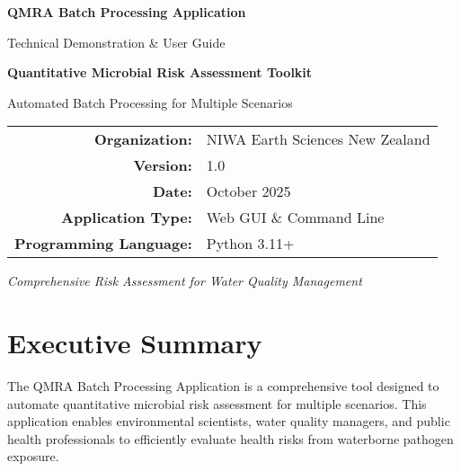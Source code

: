 \documentclass[11pt,a4paper]{article}
\begin{document}
\begin{titlepage}
    \centering
    \vspace*{2cm}

    {\Huge\bfseries\color{niwablue} QMRA Batch Processing Application\par}
    \vspace{0.5cm}
    {\LARGE Technical Demonstration \& User Guide\par}
    \vspace{2cm}

    {\Large\bfseries Quantitative Microbial Risk Assessment Toolkit\par}
    \vspace{0.5cm}
    {\large Automated Batch Processing for Multiple Scenarios\par}

    \vspace{3cm}

    \begin{tabular}{rl}
        \textbf{Organization:} & NIWA Earth Sciences New Zealand \\
        \textbf{Version:} & 1.0 \\
        \textbf{Date:} & October 2025 \\
        \textbf{Application Type:} & Web GUI \& Command Line \\
        \textbf{Programming Language:} & Python 3.11+ \\
    \end{tabular}

    \vfill

    {\large\textit{Comprehensive Risk Assessment for Water Quality Management}\par}

\end{titlepage}

\tableofcontents
\newpage

\section{Executive Summary}

The QMRA Batch Processing Application is a comprehensive tool designed to automate quantitative microbial risk assessment for multiple scenarios. This application enables environmental scientists, water quality managers, and public health professionals to efficiently evaluate health risks from waterborne pathogen exposure.
\end{document}

